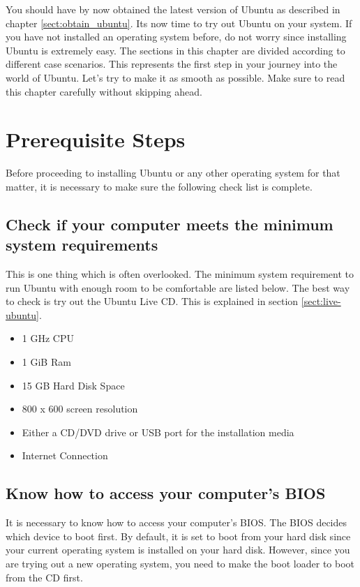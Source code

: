You should have by now obtained the latest version of Ubuntu as described in chapter \ref{sect:obtain_ubuntu}. Its now time to try out Ubuntu on your system. If you have not installed an operating system before, do not worry since installing Ubuntu is extremely easy. The sections in this chapter are divided according to different case scenarios. This represents the first step in your journey into the world of Ubuntu. Let's try to make it as smooth as possible. Make sure to read this chapter carefully without skipping ahead.

\section{Prerequisite Steps}
Before proceeding to installing Ubuntu or any other operating system for that matter, it is necessary to make sure the following check list is complete. 

\subsection*{Check if your computer meets the minimum system requirements}
This is one thing which is often overlooked. The minimum system requirement to run Ubuntu with enough room to be comfortable are listed below. The best way to check is try out the Ubuntu Live CD. This is explained in section \ref{sect:live-ubuntu}.

\begin{itemize}
	\item 1 GHz CPU 
	\item 1 GiB Ram
	\item 15 GB Hard Disk Space
	\item 800 x 600 screen resolution
	\item Either a CD/DVD drive or USB port for the installation media
	\item Internet Connection
\end{itemize}

\subsection*{Know how to access your computer's BIOS}
It is necessary to know how to access your computer's BIOS. The BIOS decides which device to boot first. By default, it is set to boot from your hard disk since your current operating system is installed on your hard disk. However, since you are trying out a new operating system, you need to make the boot loader to boot from the CD first. \\

